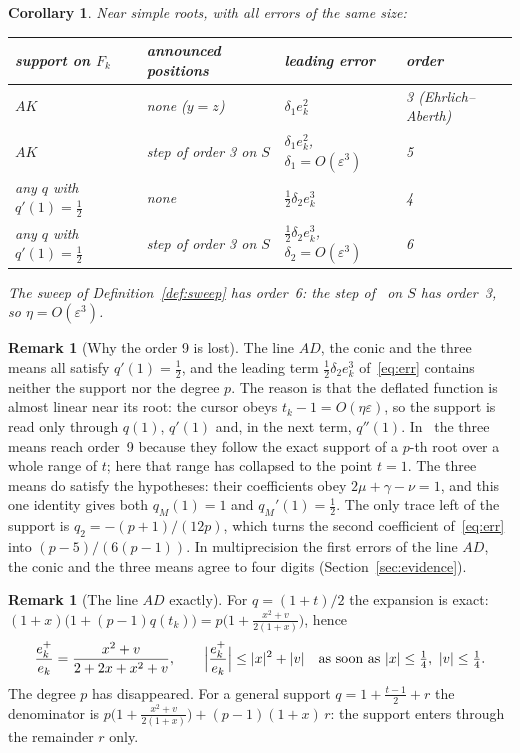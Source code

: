 \documentclass[10pt,a4paper]{article}
\newtheorem{corollary}[theorem]{Corollary}
\theoremstyle{definition}
\newtheorem{remark}[theorem]{Remark}
\numberwithin{equation}{section}
\begin{document}
\begin{corollary}\label{cor:orders}
Near simple roots, with all errors of the same size:
\begin{center}\small
\begin{tabular}{llll}
\toprule
support on $F_k$ & announced positions & leading error & order\\
\midrule
$AK$ & none ($y=z$) & $\delta_1e_k^2$ & 3 (Ehrlich--Aberth)\\
$AK$ & step of order 3 on $S$ & $\delta_1e_k^2$, $\delta_1=O(\varepsilon^3)$ & 5\\
any $q$ with $q'(1)=\frac12$ & none & $\frac12\delta_2e_k^3$ & 4\\
any $q$ with $q'(1)=\frac12$ & step of order 3 on $S$ & $\frac12\delta_2e_k^3$, $\delta_2=O(\varepsilon^3)$ & 6\\
\bottomrule
\end{tabular}
\end{center}
The sweep of Definition~\ref{def:sweep} has order~6: the step of~\cite{g2} on $S$ has order~3, so
$\eta=O(\varepsilon^3)$.
\end{corollary}

\begin{remark}[Why the order 9 is lost]\label{rem:nine}
The line $AD$, the conic and the three means all satisfy $q'(1)=\frac12$, and the leading term
$\frac12\delta_2e_k^3$ of~\eqref{eq:err} contains neither the support nor the degree $p$. The reason is
that the deflated function is almost linear near its root: the cursor obeys
$t_k-1=O(\eta\varepsilon)$, so the support is read only through $q(1)$, $q'(1)$ and, in the next term,
$q''(1)$. In~\cite{v29} the three means reach order~9 because they follow the exact support of a
$p$-th root over a whole range of $t$; here that range has collapsed to the point $t=1$. The three
means do satisfy the hypotheses: their coefficients obey $2\mu+\gamma-\nu=1$, and this one identity
gives both $q_M(1)=1$ and $q_M'(1)=\frac12$. The only trace left of the support is
$q_2=-(p+1)/(12p)$, which turns the second coefficient of~\eqref{eq:err} into $(p-5)/(6(p-1))$. In multiprecision the first errors of the line $AD$, the
conic and the three means agree to four digits (Section~\ref{sec:evidence}).
\end{remark}

\begin{remark}[The line $AD$ exactly]\label{rem:ad}
For $q=(1+t)/2$ the expansion is exact: $(1+x)\bigl(1+(p-1)q(t_k)\bigr)=p\bigl(1+\frac{x^2+v}{2(1+x)}\bigr)$,
hence
\[
 \frac{e_k^+}{e_k}=\frac{x^2+v}{2+2x+x^2+v},\qquad
 \Bigl|\frac{e_k^+}{e_k}\Bigr|\le|x|^2+|v|\quad\text{as soon as }|x|\le\tfrac14,\ |v|\le\tfrac14 .
\]
The degree $p$ has disappeared. For a general support $q=1+\frac{t-1}2+r$ the denominator is
$p\bigl(1+\frac{x^2+v}{2(1+x)}\bigr)+(p-1)(1+x)\,r$: the support enters through the remainder $r$ only.
\end{remark}
\end{document}
